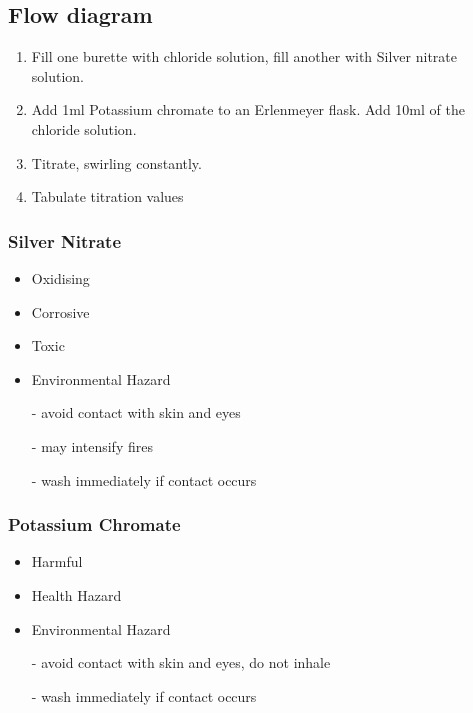 \documentclass[a4paper, british]{article}
\begin{document}
\begin{appendices}
    \section{Flow diagram}

    \begin{enumerate}
        \item Fill one burette with chloride solution, fill another with Silver nitrate solution.
        \item Add 1ml Potassium chromate to an Erlenmeyer flask. Add 10ml of the chloride solution.
        \item Titrate, swirling constantly.
        \item Tabulate titration values
    \end{enumerate}

    \subsubsection*{Silver Nitrate}
    \begin{itemize}
        \item Oxidising
        \item Corrosive
        \item Toxic
        \item Environmental Hazard
        \item[-] avoid contact with skin and eyes
        \item[-] may intensify fires
        \item[-] wash immediately if contact occurs
      \end{itemize}

      \subsubsection*{Potassium Chromate}
      \begin{itemize}
          \item Harmful
          \item Health Hazard
          \item Environmental Hazard
          \item[-] avoid contact with skin and eyes, do not inhale
          \item[-] wash immediately if contact occurs
        \end{itemize}

    \newpage
    
\end{appendices}
\end{document}
